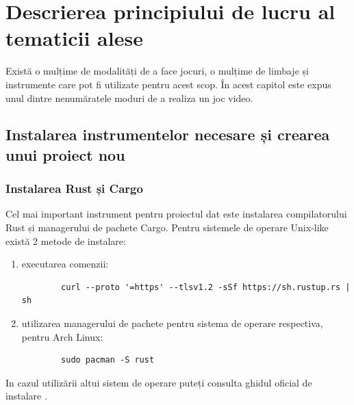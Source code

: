 \clearpage
\section{Descrierea principiului de lucru al tematicii alese}
Există o mulțime de modalități de a face jocuri, o mulțime de limbaje și instrumente care pot fi utilizate pentru acest scop. În acest capitol este expus unul dintre nenumăratele moduri de a realiza un joc video. 

\subsection{Instalarea instrumentelor necesare și crearea unui proiect nou}
\subsubsection{Instalarea Rust și Cargo}
Cel mai important instrument pentru proiectul dat este instalarea compilatorului Rust și managerului de pachete Cargo. Pentru sistemele de operare Unix-like există 2 metode de instalare:
\begin{enumerate}
    \item executarea comenzii\cite{InstallRust}:
        \begin{lstlisting}
        curl --proto '=https' --tlsv1.2 -sSf https://sh.rustup.rs | sh
        \end{lstlisting}
    \item utilizarea managerului de pachete
        pentru sistema de operare respectiva,
        pentru Arch Linux:
        \begin{lstlisting}
        sudo pacman -S rust
        \end{lstlisting}
\end{enumerate}
In cazul utilizării altui sistem de operare puteți consulta ghidul oficial de instalare \cite{InstallRust}.


